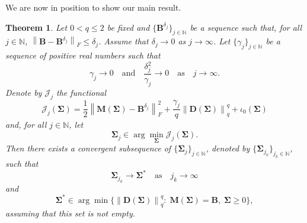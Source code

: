 \documentclass[final,leqno]{siamltex}
\newtheorem{thm}{Theorem}
\newcommand{\N}{{\mathbb N}}
\newcommand{\norm}[1]{\left\| #1 \right\|}
\newcommand{\Sigmab}{\mathbf{\Sigma}}
\begin{document}
We are now in position to show our main result.
\begin{thm}
	Let $0<q\leq 2$ be fixed and $\{\mathbf{B}^{\delta_j}\}_{j\in\N}$ be a sequence such that, for all $j\in\N$, $\norm{\mathbf{B}-\mathbf{B}^{\delta_j}}_F\leq\delta_j$.
	Assume that $\delta_j\rightarrow0$ as $j\rightarrow\infty$. Let $\{\gamma_j\}_{j\in\N}$ be a sequence of positive real numbers such that
	$$
	\gamma_j\rightarrow0\quad\mbox{and}\quad\frac{\delta^2_j}{\gamma_j}\rightarrow0\quad\mbox{as}\quad j\rightarrow\infty.
	$$
	Denote by $\mathcal{J}_j$ the functional
	$$
	\mathcal{J}_j(\Sigmab)=\frac{1}{2}\norm{\mathbf{M}(\mathbf{\Sigma})-\mathbf{B}^{\delta_j}}_F^2+\frac{\gamma_j}{q}\norm{\mathbf{D}(\mathbf{\Sigma})}_q^q+\iota_0(\Sigmab)
	$$
	and, for all $j\in\N$, let
	$$
	\Sigmab_j\in\arg\min_{\Sigmab}\mathcal{J}_j(\Sigmab).
	$$
	Then there exists a convergent subsequence of $\{\Sigmab_j\}_{j\in\N}$, denoted by $\{\Sigmab_{j_k}\}_{j_k\in\N}$, such that
	$$
	\Sigmab_{j_k}\rightarrow\Sigmab^*\quad\mbox{as}\quad j_k\rightarrow\infty
	$$
	and
	$$
	\Sigmab^*\in\arg\min\{\norm{\mathbf{D}(\Sigmab)}_q^q:\;\mathbf{M}(\Sigmab)=\mathbf{B},\; \Sigmab\geq0\},
	$$
	assuming that this set is not empty.
\end{thm}
\end{document}
